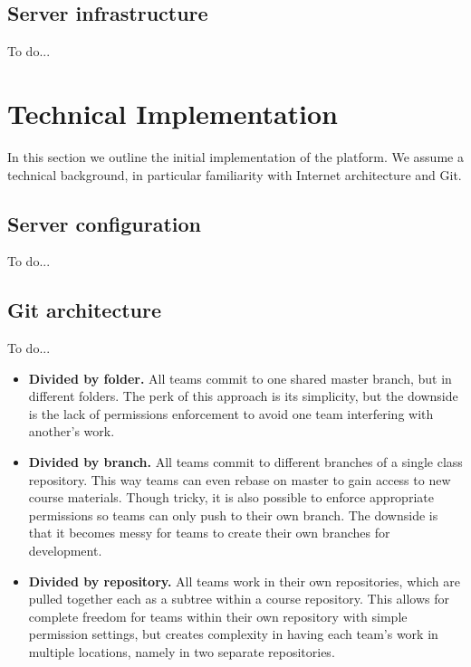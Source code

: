 \documentclass[12pt,twoside,vi]{mitthesis}
\newcommand{\wip}[1]{{\color{red} To do...}}
\begin{document}
\subsection{Server infrastructure}

\wip{reliance on other software (letsencrypt, nginx, python and javascript, bash)}

\section{Technical Implementation}

In this section we outline the initial implementation of the platform. We assume a technical background, in particular familiarity with Internet architecture and Git.

\subsection{Server configuration}

\wip{DigitalOcean droplet https://www.digitalocean.com/community/tutorials/how-to-install-and-configure-gitlab-on-ubuntu-16-04 
GitLab [built in for DO]
NameCheap domain and networking
nginx customization
Lets encrypt}

\subsection{Git architecture}

\wip{motivate this}

\begin{itemize}
\item \textbf{Divided by folder.} All teams commit to one shared master branch, but in different folders. The perk of this approach is its simplicity, but the downside is the lack of permissions enforcement to avoid one team interfering with another’s work.
\item \textbf{Divided by branch.} All teams commit to different branches of a single class repository. This way teams can even rebase on master to gain access to new course materials. Though tricky, it is also possible to enforce appropriate permissions so teams can only push to their own branch. The downside is that it becomes messy for teams to create their own branches for development.
\item \textbf{Divided by repository.} All teams work in their own repositories, which are pulled together each as a subtree within a course repository. This allows for complete freedom for teams within their own repository with simple permission settings, but creates complexity in having each team’s work in multiple locations, namely in two separate repositories. 
\end{itemize}
\end{document}
